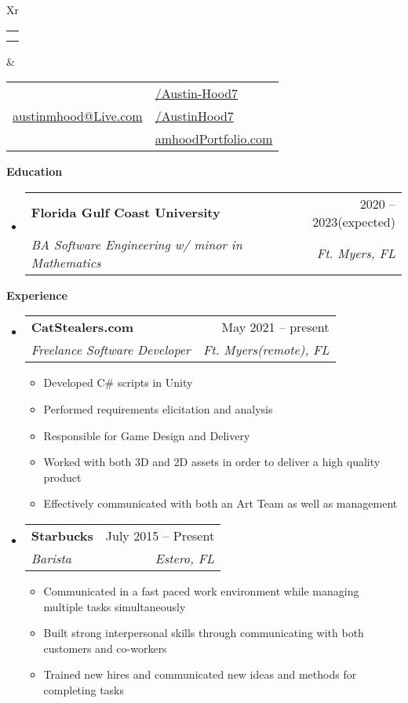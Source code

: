 \documentclass[letterpaper,12pt]{article}[leftmargin=*]
\makeatletter
\def \fullname {Austin Hood}
\def \subtitle {}
\def \linkedinicon {\faLinkedin}
\def \linkedinlink {https://linkedin.com/in/austin-hood7}
\def \linkedintext {/Austin-Hood7}
\def \phoneicon {\faPhone}
\def \phonetext {+1-954-665-7055}
\def \emailicon {\faEnvelope}
\def \emaillink {mailto:austinmhood@live.com}
\def \emailtext {austinmhood@Live.com}
\def \githubicon {\faGithub}
\def \githublink {https://github.com/AustinHood7}
\def \githubtext {/AustinHood7}
\def \websiteicon {\faGlobe}
\def \websitelink {https://amhoodPortfolio.weebly.com/}
\def \websitetext {amhoodPortfolio.com}
\def \headertype {\doublecol} %
\def \entryspacing {-0pt}
\def \linkedin {\linkedinicon \hspace{3pt}\href{\linkedinlink}{\linkedintext}}
\def \phone {\phoneicon \hspace{3pt}{ \phonetext}}
\def \email {\emailicon \hspace{3pt}\href{\emaillink}{\emailtext}}
\def \github {\githubicon \hspace{3pt}\href{\githublink}{\githubtext}}
\def \website {\websiteicon \hspace{3pt}\href{\websitelink}{\websitetext}}
\renewcommand{\section}[2]{\vspace{5pt}
  \colorbox{secondary}{\color{white}\raggedbottom\normalsize\textbf{{#1}{\hspace{7pt}#2}}}
}
\newcommand{\resumeEntryStart}{\begin{itemize}[leftmargin=2.5mm]}
\newcommand{\resumeEntryEnd}{\end{itemize}\vspace{\entryspacing}}
\newcommand{\resumeItemListStart}{\begin{itemize}[leftmargin=4.5mm]}
\newcommand{\resumeItemListEnd}{\end{itemize}}
\newcommand{\resumeItem}[1]{
  \item\small{
    {#1 \vspace{-2pt}}
  }
}
\newcommand{\resumeEntryTSDL}[4]{
  \vspace{-1pt}\item[]
    \begin{tabularx}{0.97\textwidth}{X@{\hspace{60pt}}r}
      \textbf{\color{primary}#1} & {\firabook\color{accent}\small#2} \\
      \textit{\color{accent}\small#3} & \textit{\color{accent}\small#4} \\
    \end{tabularx}\vspace{-6pt}
}
\newcommand{\doublecol}[6]{
  \begin{tabularx}{\textwidth}{Xr}
    {
      \begin{tabular}[c]{l}
        \fontsize{35}{45}\selectfont{\color{primary}{{\textbf{\fullname}}}} \\
        {\textit{\subtitle}} %
      \end{tabular}
    } & {
      \begin{tabular}[c]{l@{\hspace{1.5em}}l}
        {\small#4} & {\small#1} \\
        {\small#5} & {\small#2} \\
        {\small#6} & {\small#3}
      \end{tabular}
    }
  \end{tabularx}
}
\newcommand{\singlecol}[6]{
  \begin{tabularx}{\textwidth}{Xr}
    {
      \begin{tabular}[b]{l}
        \fontsize{35}{45}\selectfont{\color{primary}{{\textbf{\fullname}}}} \\
        {\textit{\subtitle}} %
      \end{tabular}
    } & {
      \begin{tabular}[c]{l}
        {\small#1} \\
        {\small#2} \\
        {\small#3} \\
        {\small#4} \\
        {\small#5} \\
        {\small#6}
      \end{tabular}
    }
  \end{tabularx}
}
\makeatother
\begin{document}


\headertype{\linkedin}{\github}{\website}{\phone}{\email}{} %
\vspace{-10pt} %

\section{\faGraduationCap}{Education}

  \resumeEntryStart
    \resumeEntryTSDL
      {Florida Gulf Coast University}{2020 -- 2023(expected)}
      {BA Software Engineering w/ minor in Mathematics}{Ft. Myers, FL}
  \resumeEntryEnd

\section{\faPieChart}{Experience}

  \resumeEntryStart
    \resumeEntryTSDL
      {CatStealers.com}{May 2021 -- present}
      {Freelance Software Developer}{Ft. Myers(remote), FL}
    \resumeItemListStart
      \resumeItem {Developed C\# scripts in Unity}
      \resumeItem {Performed requirements elicitation and analysis}
      \resumeItem {Responsible for Game Design and Delivery}
      \resumeItem {Worked with both 3D and 2D assets in order to deliver a high quality product}
      \resumeItem {Effectively communicated with both an Art Team as well as management}
    \resumeItemListEnd
  \resumeEntryEnd
  
  \resumeEntryStart
    \resumeEntryTSDL
      {Starbucks}{July 2015 -- Present}
      {Barista}{Estero, FL}
    \resumeItemListStart
      \resumeItem {Communicated in a fast paced work environment while managing multiple tasks simultaneously}
      \resumeItem {Built strong interpersonal skills through communicating with both customers and co-workers}
      \resumeItem {Trained new hires and communicated new ideas and methods for completing tasks}
    \resumeItemListEnd
  \resumeEntryEnd
\end{document}
